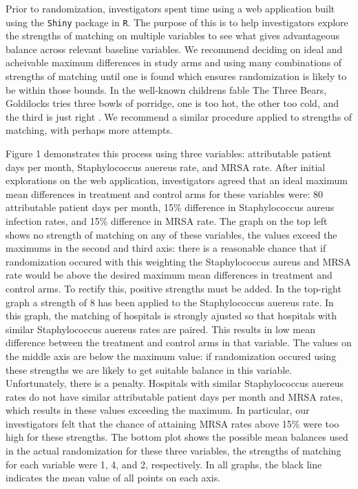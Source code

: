 \documentclass[]{sagej}
\begin{document}
Prior to randomization, investigators spent time using a web application
built using the \texttt{Shiny} package in \texttt{R}. The purpose of
this is to help investigators explore the strengths of matching on
multiple variables to see what gives advantageous balance across
relevant baseline variables. We recommend deciding on ideal and
acheivable maximum differences in study arms and using many combinations
of strengths of matching until one is found which ensures randomization
is likely to be within those bounds. In the well-known childrens fable
The Three Bears, Goldilocks tries three bowls of porridge, one is too
hot, the other too cold, and the third is just right \citep{3Bears}. We
recommend a similar procedure applied to strengths of matching, with
perhaps more attempts.

Figure 1 demonstrates this process using three variables: attributable
patient days per month, Staphylococcus auereus rate, and MRSA rate.
After initial explorations on the web application, investigators agreed
that an ideal maximum mean differences in treatment and control arms for
these variables were: 80 attributable patient days per month, 15\%
difference in Staphylococcus aureus infection rates, and 15\% difference
in MRSA rate. The graph on the top left shows no strength of matching on
any of these variables, the values exceed the maximums in the second and
third axis: there is a reasonable chance that if randomization occured
with this weighting the Staphylococcus aureus and MRSA rate would be
above the desired maximum mean differences in treatment and control
arms. To rectify this, positive strengths must be added. In the
top-right graph a strength of 8 has been applied to the Staphylococcus
auereus rate. In this graph, the matching of hospitals is strongly
ajusted so that hospitals with similar Staphylococcus auereus rates are
paired. This results in low mean difference between the treatment and
control arms in that variable. The values on the middle axis are below
the maximum value: if randomization occured using these strengths we are
likely to get suitable balance in this variable. Unfortunately, there is
a penalty. Hospitals with similar Staphylococcus auereus rates do not
have similar attributable patient days per month and MRSA rates, which
results in these values exceeding the maximum. In particular, our
investigators felt that the chance of attaining MRSA rates above 15\%
were too high for these strengths. The bottom plot shows the possible
mean balances used in the actual randomization for these three
variables, the strengths of matching for each variable were 1, 4, and 2,
respectively. In all graphs, the black line indicates the mean value of
all points on each axis.
\end{document}
